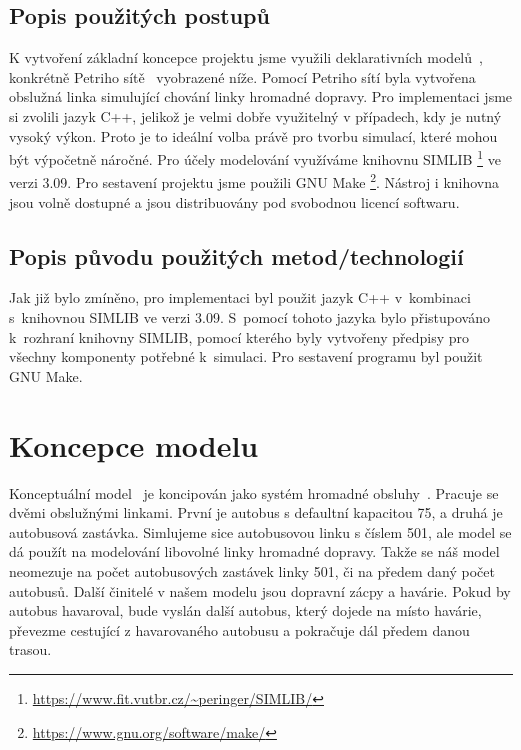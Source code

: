 \documentclass[a4paper]{article}
\begin{document}
        \subsection{Popis použitých postupů}
        \label{subsec:methods}

            K vytvoření základní koncepce projektu jsme využili deklarativních modelů~\cite[snímek 49]{IMS_slides}, konkrétně Petriho sítě~\cite[snímek 123]{IMS_slides} vyobrazené níže.
            Pomocí Petriho sítí byla vytvořena obslužná linka simulující chování linky hromadné dopravy. Pro implementaci jsme si zvolili jazyk C++, jelikož je velmi dobře využitelný v případech, kdy je nutný vysoký výkon. Proto je to ideální volba právě pro tvorbu simulací, které mohou být výpočetně náročné. Pro účely modelování využíváme knihovnu SIMLIB \footnote{\url{https://www.fit.vutbr.cz/~peringer/SIMLIB/}} ve verzi 3.09. Pro sestavení projektu jsme použili GNU Make \footnote{\url{https://www.gnu.org/software/make/}}. Nástroj i knihovna jsou volně dostupné a jsou distribuovány pod svobodnou licencí softwaru.
            

        \subsection{Popis původu použitých metod/technologií}
        \label{subsec:techology}

            Jak již bylo zmíněno, pro implementaci byl použit jazyk C++ v~kombinaci s~knihovnou SIMLIB ve verzi 3.09. S~pomocí tohoto jazyka
            bylo přistupováno k~rozhraní knihovny SIMLIB, pomocí kterého byly vytvořeny předpisy pro všechny komponenty potřebné k~simulaci.
            Pro sestavení programu byl použit GNU Make.

    \section{Koncepce modelu}
    \label{sec:concept}

        Konceptuální model~\cite[snímek 48]{IMS_slides} je koncipován jako systém hromadné obsluhy~\cite[snímek 136]{IMS_slides}.
        Pracuje se dvěmi obslužnými linkami. První je autobus s defaultní kapacitou 75, a druhá je autobusová zastávka. Simlujeme sice autobusovou linku s číslem 501, ale model se dá použít na modelování libovolné linky hromadné dopravy. Takže se náš model neomezuje na počet autobusových zastávek linky 501, či na předem daný počet autobusů. Další činitelé v našem modelu jsou dopravní zácpy a havárie. Pokud by autobus havaroval, bude vyslán další autobus, který dojede na místo havárie, převezme cestující z havarovaného autobusu a pokračuje dál předem danou trasou.
\end{document}
